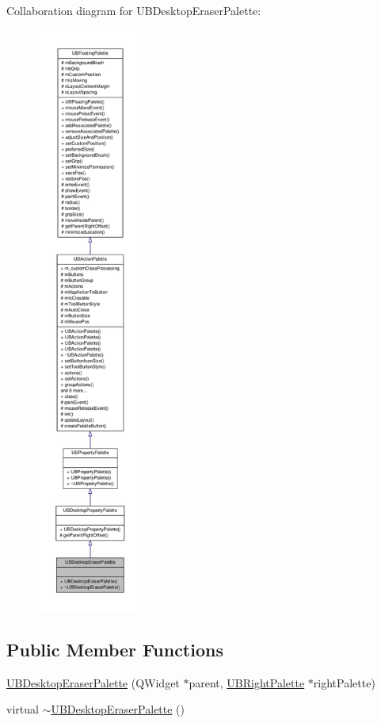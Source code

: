 Collaboration diagram for U\-B\-Desktop\-Eraser\-Palette\-:
\nopagebreak
\begin{figure}[H]
\begin{center}
\leavevmode
\includegraphics[height=550pt]{d7/ddd/class_u_b_desktop_eraser_palette__coll__graph}
\end{center}
\end{figure}
\subsection*{Public Member Functions}
\begin{DoxyCompactItemize}
\item 
\hyperlink{class_u_b_desktop_eraser_palette_a120edf48766c1aa8db17b106a93f7e73}{U\-B\-Desktop\-Eraser\-Palette} (Q\-Widget $\ast$parent, \hyperlink{class_u_b_right_palette}{U\-B\-Right\-Palette} $\ast$right\-Palette)
\item 
virtual \hyperlink{class_u_b_desktop_eraser_palette_af992b33d69fd2b7b79e79f752a114de7}{$\sim$\-U\-B\-Desktop\-Eraser\-Palette} ()
\end{DoxyCompactItemize}
